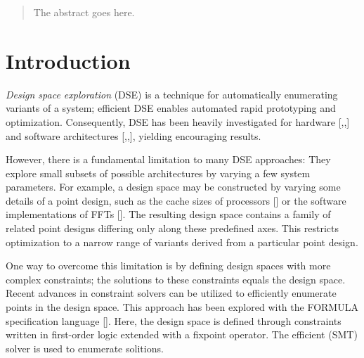 \documentclass[conference]{IEEEtran}
\begin{document}
\begin{abstract}
The abstract goes here.
\end{abstract}





%
\IEEEpeerreviewmaketitle

\section{Introduction}
\textit{Design space exploration} (DSE) is a technique for automatically enumerating variants of a system; efficient DSE enables automated rapid prototyping and optimization. Consequently, DSE has been heavily investigated for hardware [,,] and software architectures [,,], yielding encouraging results. 

However, there is a fundamental limitation to many DSE approaches: They explore small subsets of possible architectures by varying a few system parameters. For example, a design space may be constructed by varying some details of a point design, such as the cache sizes of processors [] or the software implementations of FFTs []. The resulting design space contains a family of related point designs differing only along these predefined axes. This restricts optimization to a narrow range of variants derived from a particular point design. 

One way to overcome this limitation is by defining design spaces with more complex constraints; the solutions to these constraints equals the design space. Recent advances in constraint solvers can be utilized to efficiently enumerate points in the design space. This approach has been explored with the FORMULA specification language []. Here, the design space is defined through constraints written in first-order logic extended with a fixpoint operator. The efficient  (SMT) solver is used to enumerate solitions.
\end{document}
